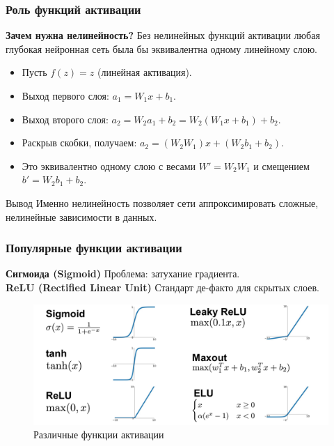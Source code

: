 \documentclass[notheorems, handout]{beamer}
\begin{document}
\begin{frame}
    \frametitle{Роль функций активации}
    \textbf{Зачем нужна нелинейность?} Без нелинейных функций активации любая глубокая нейронная сеть была бы эквивалентна одному линейному слою.
    \begin{itemize}
        \item Пусть $f(z) = z$ (линейная активация).
        \item Выход первого слоя: $a_1 = W_1 x + b_1$.
        \item Выход второго слоя: $a_2 = W_2 a_1 + b_2 = W_2(W_1 x + b_1) + b_2$.
        \item Раскрыв скобки, получаем: $a_2 = (W_2 W_1)x + (W_2 b_1 + b_2)$.
        \item Это эквивалентно одному слою с весами $W' = W_2 W_1$ и смещением $b' = W_2 b_1 + b_2$.
    \end{itemize}
    \vfill
    \begin{block}{Вывод}
    Именно нелинейность позволяет сети аппроксимировать сложные, нелинейные зависимости в данных.
    \end{block}
\end{frame}

\begin{frame}
    \frametitle{Популярные функции активации}
        \textbf{Сигмоида (Sigmoid)} Проблема: затухание градиента.\\
        \textbf{ReLU (Rectified Linear Unit)} Стандарт де-факто для скрытых слоев.
        \begin{figure}
        \includegraphics[width=\textwidth]{img/activation.png}
        \caption{Различные функции активации}
        \end{figure}
\end{frame}
\end{document}
